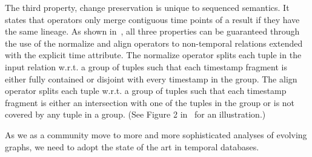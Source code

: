 The third property, change preservation is unique to sequenced
semantics.  It states that operators only merge contiguous time points
of a result if they have the same lineage.  As shown
in~\cite{Dignos2012}, all three properties can be guaranteed through
the use of the normalize and align operators to non-temporal relations
extended with the explicit time attribute.  The normalize operator
splits each tuple in the input relation w.r.t. a group of tuples such
that each timestamp fragment is either fully contained or disjoint
with every timestamp in the group.  The align operator splits each
tuple w.r.t. a group of tuples such that each timestamp fragment is
either an intersection with one of the tuples in the group or is not
covered by any tuple in a group. (See Figure 2 in~\cite{Dignos2012}
for an illustration.)

As we as a community move to more and more sophisticated analyses of
evolving graphs, we need to adopt the state of the art in temporal
databases.
